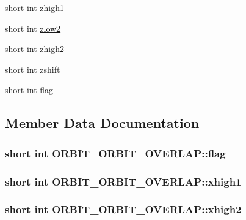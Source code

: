 \begin{DoxyCompactItemize}
short int \hyperlink{struct_o_r_b_i_t___o_r_b_i_t___o_v_e_r_l_a_p_a946834590b3a3e27a110f9b6f78bdac3}{zhigh1}
\item 
short int \hyperlink{struct_o_r_b_i_t___o_r_b_i_t___o_v_e_r_l_a_p_a8a0f7d1c06053b24706c10ac068b9508}{zlow2}
\item 
short int \hyperlink{struct_o_r_b_i_t___o_r_b_i_t___o_v_e_r_l_a_p_ab6949efc55872f5ea087993fd4cb3323}{zhigh2}
\item 
short int \hyperlink{struct_o_r_b_i_t___o_r_b_i_t___o_v_e_r_l_a_p_af45c072333558da61697126e33b5b7a1}{zshift}
\item 
short int \hyperlink{struct_o_r_b_i_t___o_r_b_i_t___o_v_e_r_l_a_p_af6fcdf4554d0fac9b99a6dd994703ca7}{flag}
\end{DoxyCompactItemize}


\subsection{Member Data Documentation}
\hypertarget{struct_o_r_b_i_t___o_r_b_i_t___o_v_e_r_l_a_p_af6fcdf4554d0fac9b99a6dd994703ca7}{
\subsubsection[{flag}]{\setlength{\rightskip}{0pt plus 5cm}short int O\-R\-B\-I\-T\-\_\-\-O\-R\-B\-I\-T\-\_\-\-O\-V\-E\-R\-L\-A\-P\-::flag}}\label{struct_o_r_b_i_t___o_r_b_i_t___o_v_e_r_l_a_p_af6fcdf4554d0fac9b99a6dd994703ca7}
\hypertarget{struct_o_r_b_i_t___o_r_b_i_t___o_v_e_r_l_a_p_a21653cf36d18e3a6a46884bdebed019b}{
\subsubsection[{xhigh1}]{\setlength{\rightskip}{0pt plus 5cm}short int O\-R\-B\-I\-T\-\_\-\-O\-R\-B\-I\-T\-\_\-\-O\-V\-E\-R\-L\-A\-P\-::xhigh1}}\label{struct_o_r_b_i_t___o_r_b_i_t___o_v_e_r_l_a_p_a21653cf36d18e3a6a46884bdebed019b}
\hypertarget{struct_o_r_b_i_t___o_r_b_i_t___o_v_e_r_l_a_p_a1883498766e26bd666a5ad7f3e86f3d4}{
\subsubsection[{xhigh2}]{\setlength{\rightskip}{0pt plus 5cm}short int O\-R\-B\-I\-T\-\_\-\-O\-R\-B\-I\-T\-\_\-\-O\-V\-E\-R\-L\-A\-P\-::xhigh2}}\label{struct_o_r_b_i_t___o_r_b_i_t___o_v_e_r_l_a_p_a1883498766e26bd666a5ad7f3e86f3d4}
